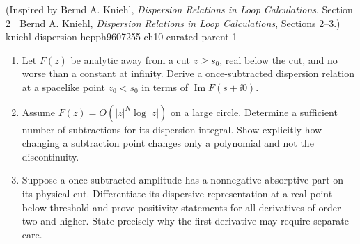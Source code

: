 \begin{enumerate}
  {(Inspired by Bernd A. Kniehl, \emph{Dispersion Relations in Loop Calculations}, Section 2 | Bernd A. Kniehl, \emph{Dispersion Relations in Loop Calculations}, Sections 2--3.)}
  {kniehl-dispersion-hepph9607255-ch10-curated-parent-1}
\begin{enumerate}
\item
Let \(F(z)\) be analytic away from a cut \(z\geq s_0\), real below the cut,
and no worse than a constant at infinity.  Derive a once-subtracted
dispersion relation at a spacelike point \(z_0<s_0\) in terms of
\(\operatorname{Im}F(s+\ii0)\).
\item
Assume \(F(z)=O(|z|^N\log |z|)\) on a large circle.  Determine a sufficient
number of subtractions for its dispersion integral.  Show explicitly how
changing a subtraction point changes only a polynomial and not the
discontinuity.
\item
Suppose a once-subtracted amplitude has a nonnegative absorptive part on its
physical cut.  Differentiate its dispersive representation at a real point
below threshold and prove positivity statements for all derivatives of
order two and higher.  State precisely why the first derivative may require
separate care.
\end{enumerate}


\end{enumerate}
